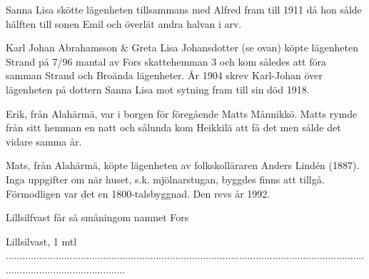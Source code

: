  Sanna Lisa skötte lägenheten tillsammans med Alfred fram till 1911 	då hon sålde hälften till sonen Emil och överlät andra halvan i arv.


 Karl Johan Abrahamsson \& Greta Lisa Johansdotter (se ovan) köpte lägenheten Strand på 7/96 mantal av Fors skattehemman 3 och kom således att föra samman Strand och Broända lägenheter. År 1904 skrev Karl-Johan över lägenheten på dottern Sanna Lisa mot sytning fram till sin död 1918.


 Erik, från Alahärmä, var i borgen för föregående Matts Männikkö. Matts rymde från sitt hemman en natt och sålunda kom Heikkilä att få det men sålde det vidare samma år.


 Mats, från Alahärmä, köpte lägenheten av folkskolläraren Anders Lindén (1887). Inga uppgifter om när huset, s.k. mjölnarstugan, byggdes finns att tillgå. Förmodligen var det en 1800-talsbyggnad. Den revs år 1992.








 Lillsilfvast får så småningom namnet Fors





Lillsilvast, 1 mtl
............................................................................................................................................................................
